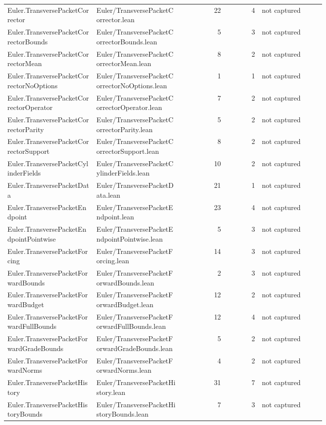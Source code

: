\documentclass[10pt]{article}
\begin{document}
\begin{longtable}{p{0.28\linewidth}p{0.27\linewidth}r r p{0.20\linewidth}}
Euler.TransversePacketCorrector & Euler/TransversePacketCorrector.lean & 22 & 4 & not captured\\
Euler.TransversePacketCorrectorBounds & Euler/TransversePacketCorrectorBounds.lean & 5 & 3 & not captured\\
Euler.TransversePacketCorrectorMean & Euler/TransversePacketCorrectorMean.lean & 8 & 2 & not captured\\
Euler.TransversePacketCorrectorNoOptions & Euler/TransversePacketCorrectorNoOptions.lean & 1 & 1 & not captured\\
Euler.TransversePacketCorrectorOperator & Euler/TransversePacketCorrectorOperator.lean & 7 & 2 & not captured\\
Euler.TransversePacketCorrectorParity & Euler/TransversePacketCorrectorParity.lean & 5 & 2 & not captured\\
Euler.TransversePacketCorrectorSupport & Euler/TransversePacketCorrectorSupport.lean & 8 & 2 & not captured\\
Euler.TransversePacketCylinderFields & Euler/TransversePacketCylinderFields.lean & 10 & 2 & not captured\\
Euler.TransversePacketData & Euler/TransversePacketData.lean & 21 & 1 & not captured\\
Euler.TransversePacketEndpoint & Euler/TransversePacketEndpoint.lean & 23 & 4 & not captured\\
Euler.TransversePacketEndpointPointwise & Euler/TransversePacketEndpointPointwise.lean & 5 & 3 & not captured\\
Euler.TransversePacketForcing & Euler/TransversePacketForcing.lean & 14 & 3 & not captured\\
Euler.TransversePacketForwardBounds & Euler/TransversePacketForwardBounds.lean & 2 & 3 & not captured\\
Euler.TransversePacketForwardBudget & Euler/TransversePacketForwardBudget.lean & 12 & 2 & not captured\\
Euler.TransversePacketForwardFullBounds & Euler/TransversePacketForwardFullBounds.lean & 12 & 4 & not captured\\
Euler.TransversePacketForwardGradeBounds & Euler/TransversePacketForwardGradeBounds.lean & 5 & 2 & not captured\\
Euler.TransversePacketForwardNorms & Euler/TransversePacketForwardNorms.lean & 4 & 2 & not captured\\
Euler.TransversePacketHistory & Euler/TransversePacketHistory.lean & 31 & 7 & not captured\\
Euler.TransversePacketHistoryBounds & Euler/TransversePacketHistoryBounds.lean & 7 & 3 & not captured\\

\end{longtable}
\end{document}
